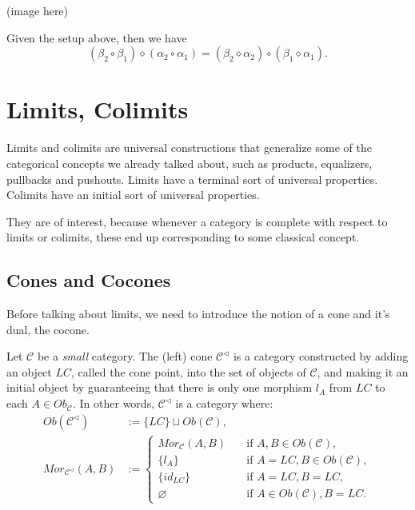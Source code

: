 \begin{theorem}
  (image here)

  Given the setup above, then we have
  \begin{displaymath}
    (\beta_2 \circ \beta_1) \diamond (\alpha_2 \circ \alpha_1) =
    (\beta_2 \diamond \alpha_2) \circ (\beta_1 \diamond \alpha_1).
  \end{displaymath}
  
\end{theorem}

\newpage
\section{Limits, Colimits}

Limits and colimits are universal constructions that generalize some of the
categorical concepts we already talked about, such as products,
equalizers, pullbacks and pushouts.
Limits have a terminal sort of universal properties.
Colimits have an initial sort of universal properties.

They are of interest, because whenever a category is complete with
respect to limits or colimits, these end up corresponding to some
classical concept.

\subsection{Cones and Cocones}

Before talking about limits, we need to introduce the notion of a cone and it's dual, the cocone.

\begin{definition}[Cone]
  Let $\mathcal C$ be a \textit{small} category. The (left) cone $\mathcal C^{\lhd}$ is a category constructed
  by adding an object $LC$, called the cone point, into the set of objects of $\mathcal C$,
  and making it an initial object by guaranteeing that there is only one morphism $l_A$ from $LC$ to each
  $A \in Ob_\mathcal C$. In other words, $\mathcal C^{\lhd}$ is a category where:
  \begin{align*}
    Ob(\mathcal C^{\lhd}) &:= \{LC\} \sqcup Ob(\mathcal C),\\
    Mor_{\mathcal C^{\lhd}}(A,B) &:=
    \begin{cases}
      Mor_\mathcal C (A,B)  \quad &\text{if } A,B \in Ob(\mathcal C), \\
      \{l_A\}  \quad &\text{if } A = LC, B \in Ob(\mathcal C), \\
      \{id_{LC}\}  \quad &\text{if } A = LC, B = LC, \\
      \varnothing \quad &\text{if } A \in Ob(\mathcal C), B = LC.
    \end{cases}
  \end{align*}
\end{definition}

